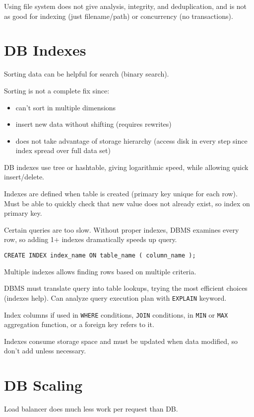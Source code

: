 \documentclass[11pt]{article}
\begin{document}
Using file system does not give analysis, integrity, and deduplication, and is not as good for
indexing (just filename/path) or concurrency (no transactions).
\section{DB Indexes}
\label{sec:orga14b900}
Sorting data can be helpful for search (binary search).

Sorting is not a complete fix since:
\begin{itemize}
\item can't sort in multiple dimensions
\item insert new data without shifting (requires rewrites)
\item does not take advantage of storage hierarchy (access disk in every step since index spread over
full data set)
\end{itemize}

DB indexes use tree or hashtable, giving logarithmic speed, while allowing quick insert/delete.

Indexes are defined when table is created (primary key unique for each row).
Must be able to quickly check that new value does not already exist, so index on primary key.

Certain queries are too slow.
Without proper indexes, DBMS examines every row, so adding 1+ indexes dramatically speeds up query.

\begin{verbatim}
CREATE INDEX index_name ON table_name ( column_name );
\end{verbatim}

Multiple indexes allows finding rows based on multiple criteria.

DBMS must translate query into table lookups, trying the most efficient choices (indexes help).
Can analyze query execution plan with \texttt{EXPLAIN} keyword.

Index columns if used in \texttt{WHERE} conditions, \texttt{JOIN} conditions, in \texttt{MIN} or \texttt{MAX} aggregation
function, or a foreign key refers to it.

Indexes consume storage space and must be updated when data modified, so don't add unless necessary.
\section{DB Scaling}
\label{sec:orgd1f21cb}
Load balancer does much less work per request than DB.
\end{document}
